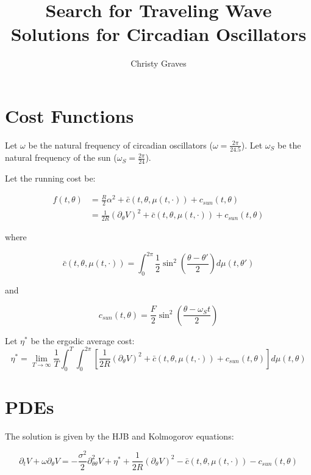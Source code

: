 \documentclass[]{article}
\title{}
\author{}
\title{Search for Traveling Wave Solutions for Circadian Oscillators}
\author{Christy Graves}
\begin{document}
\maketitle

\section{Cost Functions}
Let $\omega$ be the natural frequency of circadian oscillators ($\omega=\frac{2\pi}{24.5}$). Let $\omega_S$ be the natural frequency of the sun ($\omega_S=\frac{2\pi}{24}$).

Let the running cost be:

\begin{equation}
\begin{split}
f(t,\theta)&=\frac{R}{2}\alpha^2+\bar{c}(t,\theta,\mu(t,\cdot))+c_{sun}(t,\theta) \\
&=\frac{1}{2R}(\partial_\theta V)^2+\bar{c}(t,\theta,\mu(t,\cdot))+c_{sun}(t,\theta)
\end{split}
\end{equation}

where

\begin{equation}
\bar{c}(t,\theta,\mu(t,\cdot))=\int_0^{2\pi}\frac{1}{2} \sin^2\left(\frac{\theta-\theta'}{2}\right)d \mu(t,\theta')
\end{equation}

and

\begin{equation}
c_{sun}(t,\theta)=\frac{F}{2} \sin^2\left(\frac{\theta-\omega_St}{2}\right)
\end{equation}

Let $\eta^*$ be the ergodic average cost:
\begin{equation}
\eta^*=\lim_{T \rightarrow \infty} \frac{1}{T} \int_0^T \int_0^{2\pi} \left[\frac{1}{2R}(\partial_\theta V)^2+\bar{c}(t,\theta,\mu(t,\cdot))+c_{sun}(t,\theta) \right] d\mu(t,\theta)
\end{equation}

\section{PDEs}
The solution is given by the HJB and Kolmogorov equations:

\begin{equation}
\partial_t V+\omega \partial_\theta V=-\frac{\sigma^2}{2}\partial_{\theta \theta}^2 V+\eta^*+\frac{1}{2R}(\partial_\theta V)^2-\bar{c}(t,\theta,\mu(t,\cdot))-c_{sun}(t,\theta)
\label{HJB}
\end{equation}
\end{document}
